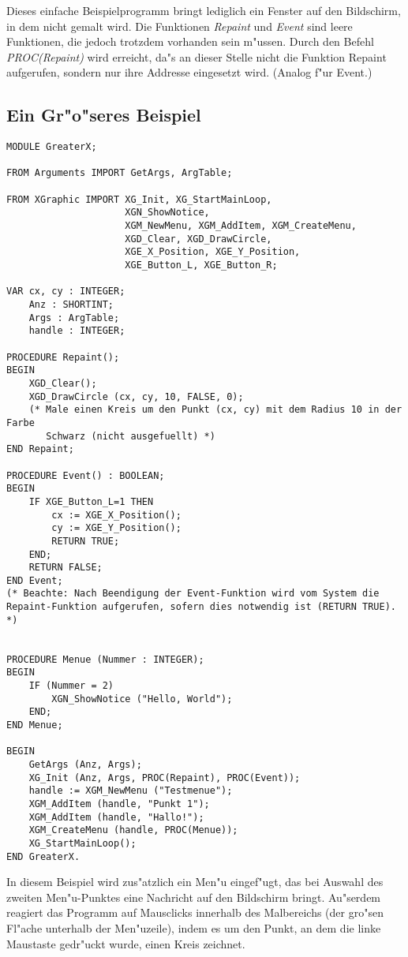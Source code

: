 Dieses einfache Beispielprogramm bringt lediglich ein Fenster auf den
Bildschirm, in dem nicht gemalt wird. Die Funktionen {\em Repaint} und
{\em Event}
sind leere Funktionen, die jedoch trotzdem vorhanden sein m"ussen. Durch
den Befehl {\em PROC(Repaint)} wird erreicht, da"s an dieser Stelle nicht die
Funktion Repaint aufgerufen, sondern nur ihre Addresse eingesetzt wird.
(Analog f"ur Event.)




\subsection{Ein Gr"o"seres Beispiel}
\begin{verbatim}
MODULE GreaterX;

FROM Arguments IMPORT GetArgs, ArgTable;

FROM XGraphic IMPORT XG_Init, XG_StartMainLoop,
                     XGN_ShowNotice,
                     XGM_NewMenu, XGM_AddItem, XGM_CreateMenu,
                     XGD_Clear, XGD_DrawCircle,
                     XGE_X_Position, XGE_Y_Position,
                     XGE_Button_L, XGE_Button_R;

VAR cx, cy : INTEGER;
    Anz : SHORTINT;
    Args : ArgTable;
    handle : INTEGER;

PROCEDURE Repaint();
BEGIN
    XGD_Clear();
    XGD_DrawCircle (cx, cy, 10, FALSE, 0);
    (* Male einen Kreis um den Punkt (cx, cy) mit dem Radius 10 in der Farbe
       Schwarz (nicht ausgefuellt) *)
END Repaint;

PROCEDURE Event() : BOOLEAN;
BEGIN
    IF XGE_Button_L=1 THEN
        cx := XGE_X_Position();
        cy := XGE_Y_Position();
        RETURN TRUE;
    END;
    RETURN FALSE;
END Event;
(* Beachte: Nach Beendigung der Event-Funktion wird vom System die
Repaint-Funktion aufgerufen, sofern dies notwendig ist (RETURN TRUE). *)


PROCEDURE Menue (Nummer : INTEGER);
BEGIN
    IF (Nummer = 2)
        XGN_ShowNotice ("Hello, World");
    END;
END Menue;

BEGIN
    GetArgs (Anz, Args);
    XG_Init (Anz, Args, PROC(Repaint), PROC(Event));
    handle := XGM_NewMenu ("Testmenue");
    XGM_AddItem (handle, "Punkt 1");
    XGM_AddItem (handle, "Hallo!");
    XGM_CreateMenu (handle, PROC(Menue));
    XG_StartMainLoop();
END GreaterX.
\end{verbatim}

In diesem Beispiel wird zus"atzlich ein Men"u eingef"ugt, das bei Auswahl des
zweiten Men"u-Punktes eine Nachricht auf den Bildschirm bringt. Au"serdem
reagiert das Programm auf Mausclicks innerhalb des Malbereichs (der gro"sen
Fl"ache unterhalb der Men"uzeile), indem es um den Punkt, an dem die linke
Maustaste gedr"uckt wurde, einen Kreis zeichnet.
    

